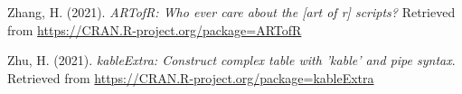 \documentclass[
  man]{apa6}
\newlength{\cslhangindent}
\newlength{\cslentryspacingunit} %
\newenvironment{CSLReferences}[2] %
 {%
  \setlength{\parindent}{0pt}
  \ifodd #1
  \let\oldpar\par
  \def\par{\hangindent=\cslhangindent\oldpar}
  \fi
  \setlength{\parskip}{#2\cslentryspacingunit}
 }%
 {}
\begin{document}
\begin{CSLReferences}{1}{0}
\leavevmode{}%
Zhang, H. (2021). \emph{ARTofR: Who ever care about the {[}art of r{]} scripts?} Retrieved from \url{https://CRAN.R-project.org/package=ARTofR}

\leavevmode{}%
Zhu, H. (2021). \emph{kableExtra: Construct complex table with 'kable' and pipe syntax}. Retrieved from \url{https://CRAN.R-project.org/package=kableExtra}

\end{CSLReferences}

\endgroup


\clearpage
\renewcommand{\listtablename}{Table captions}
\end{document}
